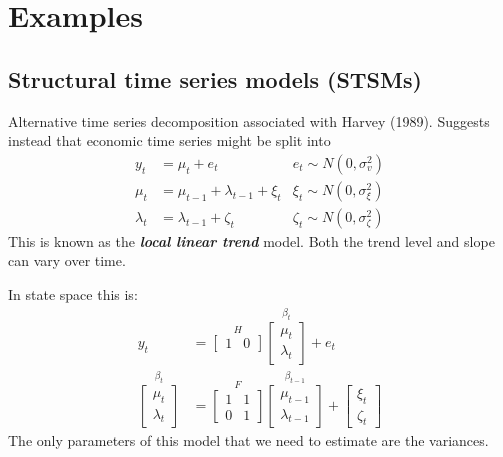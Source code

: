 \documentclass[
  letterpaper,
]{book}
\begin{document}
\hypertarget{examples}{%
\section{Examples}\label{examples}}

\hypertarget{structural-time-series-models-stsms}{%
\subsection{Structural time series models
(STSMs)}\label{structural-time-series-models-stsms}}

Alternative time series decomposition associated with Harvey (1989).
Suggests instead that economic time series might be split into \[
    \begin{align}
    y_t &=\mu_t + e_t     &e_t\sim N\left(0,\sigma_v^2\right) \\
    \mu_t &=\mu_{t-1}+\lambda_{t-1}+\xi_t   &\xi_t\sim N\left(0,\sigma_\xi^2\right) \\
    \lambda_t &=\lambda_{t-1}+\zeta_t   &\zeta_t\sim N\left(0,\sigma_\zeta^2 \right)
    \end{align}
\] This is known as the \textbf{\emph{local linear trend}} model. Both
the trend level and slope can vary over time.

In state space this is: \[
    \begin{align}
    y_t &= \overset{H}{\begin{bmatrix} 1 & 0 \end{bmatrix}}
    \overset{\beta_t}{\begin{bmatrix}\mu_t \\ \lambda_t \end{bmatrix} } + e_{t} \\
    \overset{\beta_t}{\begin{bmatrix}\mu_t \\ \lambda_t \end{bmatrix}} &=
    \overset{F}{\begin{bmatrix} 1 & 1 \\  0 & 1 \end{bmatrix}}
    \overset{\beta_{t-1}}{\begin{bmatrix}\mu_{t-1} \\ \lambda_{t-1} \end{bmatrix}} + 
    \begin{bmatrix} \xi_t \\ \zeta_t\end{bmatrix} 
    \end{align}
\] The only parameters of this model that we need to estimate are the
variances.
\end{document}
